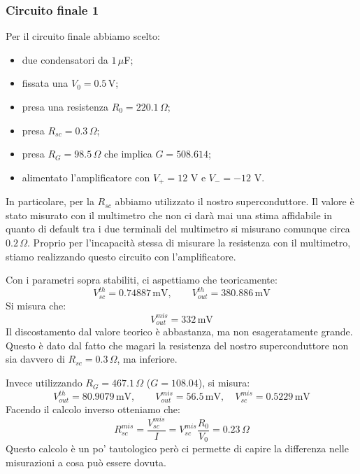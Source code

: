 \documentclass[../main/main.tex]{subfiles}
\begin{document}
\subsubsection{Circuito finale 1}
Per il circuito finale abbiamo scelto:
\begin{itemize}
\item due condensatori da \( 1 \, \mu  \)F;
\item fissata una \( V_0 = 0.5 \, \)V;
\item presa una resistenza \( R_0 = 220.1 \,\Omega  \);
\item presa \( R_{sc} = 0.3 \, \Omega  \);
\item presa \( R_G = 98.5 \, \Omega  \) che implica \( G = 508.614 \);
\item alimentato l'amplificatore con \( V_+ = 12 \) V e \( V_- = -12 \) V.
\end{itemize}
In particolare, per la \( R_{sc} \) abbiamo utilizzato il nostro superconduttore. Il valore è stato misurato con il multimetro che non ci darà mai una stima affidabile in quanto di default tra i due terminali del multimetro si misurano comunque circa \( 0.2 \, \Omega  \). Proprio per l'incapacità stessa di misurare la resistenza con il multimetro, stiamo realizzando questo circuito con l'amplificatore.

Con i parametri sopra stabiliti, ci aspettiamo che teoricamente:
\begin{equation*}
  V_{sc}^{th} = 0.74887 \, \text{mV}, \qquad V_{out}^{th} = 380.886 \, \text{mV}
\end{equation*}
Si misura che:
\begin{equation*}
   V_{out}^{mis} =  332 \, \text{mV}
\end{equation*}
Il discostamento dal valore teorico è abbastanza, ma non esageratamente grande. Questo è dato dal fatto che magari la resistenza del nostro superconduttore non sia davvero di \( R_{sc} = 0.3 \, \Omega  \), ma inferiore.

Invece utilizzando \( R_G = 467.1 \, \Omega  \) (\( G = 108.04 \)), si misura:
\begin{equation*}
   V_{out}^{th} =  80.9079 \, \text{mV}, \qquad V_{out}^{mis} =  56.5 \, \text{mV}, \quad V_{sc}^{mis} = 0.5229 \, \text{mV}
\end{equation*}
Facendo il calcolo inverso otteniamo che:
\begin{equation*}
  R_{sc}^{mis} = \frac{V_{sc}^{mis}}{I} = V_{sc}^{mis} \frac{R_0}{V_0} = 0.23 \, \Omega
\end{equation*}
Questo calcolo è un po' tautologico però ci permette di capire la differenza nelle misurazioni a cosa può essere dovuta.
\end{document}
